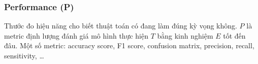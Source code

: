 \subsubsection{Performance (P)}
\begin{ynghia}[title={Thước đo hiệu năng}]
Thước đo hiệu năng cho biết thuật toán có đang làm đúng kỳ vọng không.
\(P\) là metric định lượng đánh giá mô hình thực hiện \(T\) bằng kinh nghiệm \(E\) tốt đến đâu.
Một số metric: accuracy score, F1 score, confusion matrix, precision, recall, sensitivity, \ldots
\end{ynghia}

